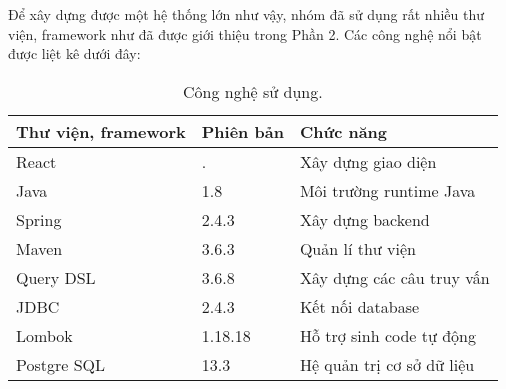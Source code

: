 Để xây dựng được một hệ thống lớn như vậy, nhóm đã sử dụng rất nhiều thư viện, framework như đã được giới thiệu trong Phần 2. Các công nghệ nổi bật được liệt kê dưới đây:

\begin{table}[h]
    \centering
    \begin{tabular}{|m{4cm}|m{2cm}|m{4cm}|}
    \hline 
        \textbf{Thư viện, framework} & \textbf{Phiên bản} & \textbf{Chức năng}\\ \hline
        React & . & Xây dựng giao diện \\ \hline
        Java & 1.8 & Môi trường runtime Java \\ \hline
        Spring & 2.4.3 & Xây dựng backend \\ \hline
        Maven & 3.6.3 & Quản lí thư viện \\ \hline
        Query DSL & 3.6.8 & Xây dựng các câu truy vấn \\ \hline
        JDBC & 2.4.3 & Kết nối database \\ \hline
        Lombok & 1.18.18 & Hỗ trợ sinh code tự động \\ \hline
        Postgre SQL & 13.3 & Hệ quản trị cơ sở dữ liệu \\ \hline
    \end{tabular}
    \caption{Công nghệ sử dụng.}
    \label{usedtech}
\end{table}